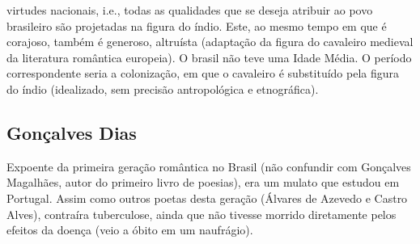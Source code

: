 \documentclass[12pt]{book}
\begin{document}
virtudes nacionais, i.e., todas as qualidades que se deseja atribuir ao povo brasileiro são projetadas na figura do índio. Este, ao mesmo tempo em que é corajoso, também é generoso, altruísta (adaptação da figura do cavaleiro medieval da literatura romântica europeia). O brasil não teve uma Idade Média. O período correspondente seria a colonização, em que o cavaleiro é substituído pela figura do índio (idealizado, sem precisão antropológica e etnográfica).
				\subsection{Gonçalves Dias}
				\par Expoente da primeira geração romântica no Brasil (não confundir com Gonçalves Magalhães, autor do primeiro livro de poesias), era um mulato que estudou em Portugal. Assim como outros poetas desta geração (Álvares de Azevedo e Castro Alves), contraíra tuberculose, ainda que não tivesse morrido diretamente pelos efeitos da doença (veio a óbito em um naufrágio).
\end{document}
